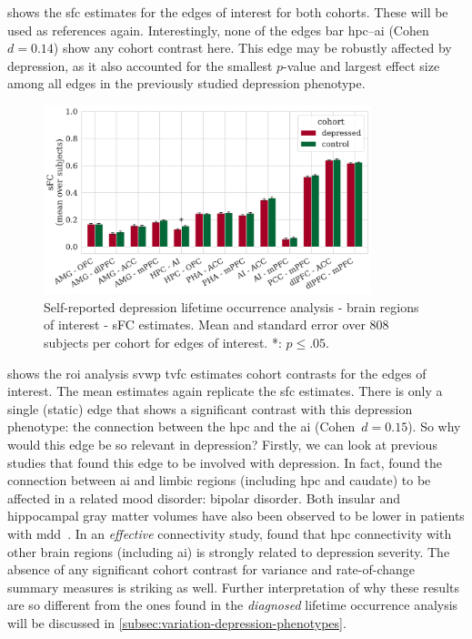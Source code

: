  shows the \gls{sfc} estimates for the edges of interest for both cohorts.
These will be used as references again.
%
Interestingly, none of the edges bar \gls{hpc}--\gls{ai} (Cohen~$d = 0.14$) show any cohort contrast here.
This edge may be robustly affected by depression, as it also accounted for the smallest $p$-value and largest effect size among all edges in the previously studied depression phenotype.


\begin{figure}[h]
  \centering
  \includegraphics[width=0.85\textwidth]{fig/ukbiobank/TVFC_predictions_summaries/lifetime_occurrence/cohort_comparison/ROI/correlation_TVFC_mean_sFC_edges_of_interest}
  \caption{
    Self-reported depression lifetime occurrence analysis - brain regions of interest - sFC estimates.
    Mean and standard error over 808 subjects per cohort for edges of interest.
    *: $p \leq .05$.
  }\label{fig:ukb-results-lo-roi-cohort-comparison-edges-of-interest-sfc}
\end{figure}


 shows the \gls{roi} analysis \gls{svwp} \gls{tvfc} estimates cohort contrasts for the edges of interest.
%
The mean estimates again replicate the \gls{sfc} estimates.
There is only a single (static) edge that shows a significant contrast with this depression phenotype: the connection between the \gls{hpc} and the \gls{ai} (Cohen~$d = 0.15$).
So why would this edge be so relevant in depression?
Firstly, we can look at previous studies that found this edge to be involved with depression.
In fact, \textcite{Ellard2019} found the connection between \gls{ai} and limbic regions (including \gls{hpc} and caudate) to be affected in a related mood disorder: bipolar disorder.
Both insular and hippocampal gray matter volumes have also been observed to be lower in patients with \gls{mdd}~\parencite{Stratmann2014}.
In an \emph{effective} connectivity study, \textcite{Kandilarova2018} found that \gls{hpc} connectivity with other brain regions (including \gls{ai}) is strongly related to depression severity.
%
The absence of any significant cohort contrast for variance and rate-of-change summary measures is striking as well.
%
Further interpretation of why these results are so different from the ones found in the \emph{diagnosed} lifetime occurrence analysis will be discussed in \cref{subsec:variation-depression-phenotypes}.



